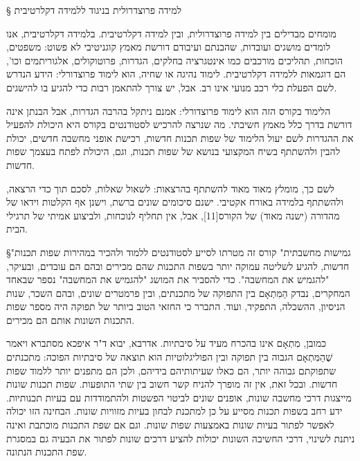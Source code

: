 \def\Title{פתח דבר}


§ למידה פרוצדרולית בניגוד ללמידה דקלרטיבית 

מומחים מבדילים בין למידה פרוצדרולית, ובין למידה דקלרטיבית. בלמידה דקלרטיבית,
אנו לומדים מושגים ועובדות, שהבנתם ועיבודם דורשת מאמץ קוגניטיבי לא פשוט: משפטים,
הוכחות, תהליכים מורכבים כמו אינטגרציה בחלקים, הגדרות, פרוטוקולים, אלגוריתמים
וכו', הם דוגמאות ללמידה דקלרטיבית. לימוד נהיגה או שחיה, הוא לימוד פרוצדורלי:
הידע הנדרש לשם הפעלת כלי רכב מנועי אינו רב. אבל, יש צורך להתאמן רבות כדי להגיע
בו להישגים.

הלימוד בקורס הזה הוא לימוד פרוצדורלי: אמנם ניתקל בהרבה הגדרות, אבל הבנתן אינה
דורשת בדרך כלל מאמץ חשיבתי. מה שנרצה להרכיש לסטודנטים בקורס היא היכולת להפעיל
את ההגדרות לשם יעול הלימוד של שפות תכנות חדשות, רכישת אופני מחשבה חדשים, יכולת
להבין ולהשתתף בשיח המקצועי בנושא של שפות תכנות, וגם, היכולת לפתח בעצמך שפות
חדשות. 

לשם כך, מומלץ מאוד מאוד להשתתף בהרצאות: לשאול שאלות, לסכם תוך כדי הרצאה,
ולהשתתף בלמידה באורח אקטיבי. ישנם סיכומים שונים ברשת, וישנן אף הקלטות וידאו של
מהדורה (ישנה מאוד) של הקורס[11], אבל, אין תחליף לנוכחות, ולביצוע אמיתי של
תרגילי הבית. 

§"גמישות מחשבתית"
קורס זה מטרתו לסייע לסטודנטים ללמוד ולהכיר במהירות שפות תכנות חדשות, להגיע
לשליטה עמוקה יותר בשפות התכנות שהם מכירים ובהם הם עובדים, ובעיקר, "להגמיש את
המחשבה". כדי להסביר את המושג "להגמיש את המחשבה" נספר שבאחד המחקרים, נבדק הַמִּתְאָם
בין התפוקה של מתכנתים, ובין פרמטרים שונים, ובהם השכר, שנות הניסיון, ההשכלה,
התפקיד, ועוד. התברר כי החזאי הטוב ביותר של תפוקה היה מספר שפות התכנות השונות
אותם הם מכירים. 

כמובן, מִתְאָם אינו בהכרח מעיד על סיבתיות. אדרבא, יבוא ד"ר איפכא מסתברא ויאמר
שֶׁהַמִּתְאָם הגבוה בין תפוקה ובין הפוליגלוטיות הוא תוצאה של סיבתיות הפוכה: מתכנתים
שתפוקתם גבוהה יותר, הם כאלו שעיתותיהם בידיהם, ולכן הם מתפנים יותר ללמוד שפות
חדשות. ובכל זאת, אין זה מופרך להניח קשר חשוב בין שתי התופעות. שפות תכנות שונות
מייצגות דרכי מחשבה שונות, אופנים שונים לביטוי הפשטות ולהתמודדות עם בעיות
תכנותיות. ידע רחב בשפות תכנות מסייע על כן למתכנת לבחון בעיות מזוויות שונות.
הבחינה הזו יכולה לאפשר לפתור בעיות שונות באמצעות שפות שונות. וגם אם שפת התכנות
מוכתבת ואינה ניתנת לשינוי, דרכי החשיבה השונות יכולות להציע דרכים שונות לפתור את
הבעיה גם במסגרת שפת התכנות הנתונה.

